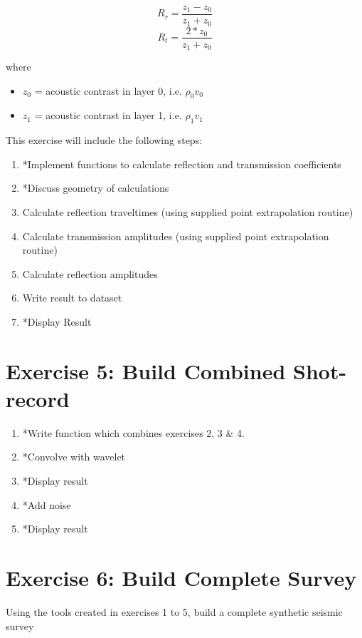 \documentclass[a4paper, 10pt]{article}
\begin{document}
\[ R_r = \frac{z_1 - z_0}{z_1+z_0}\]
\[ R_t = \frac{2*z_0}{z_1+z_0}\]

where 
\begin{itemize}
\item $z_0$  = acoustic contrast in layer 0, i.e. $\rho_0 v_0$
\item $z_1$ = acoustic contrast in layer 1, i.e. $\rho_1 v_1$
\end{itemize}

This exercise will include the following steps:


\begin{enumerate}
\item *Implement functions to calculate reflection and transmission coefficients
\item *Discuss geometry of calculations
\item Calculate reflection traveltimes (using supplied point extrapolation routine)
\item Calculate transmission amplitudes (using supplied point extrapolation routine)
\item Calculate reflection amplitudes
\item Write result to dataset
\item *Display Result
\end{enumerate}


\section*{Exercise 5: Build Combined Shot-record}

\begin{enumerate}
\item *Write function which combines exercises 2, 3 \& 4.
\item *Convolve with wavelet
\item *Display result
\item *Add noise
\item *Display result
\end{enumerate}
\section*{Exercise 6: Build Complete Survey}

Using the tools created in exercises 1 to 5, build a complete synthetic seismic survey
\end{document}
